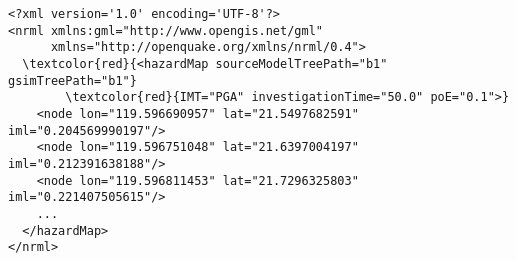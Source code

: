 \begin{Verbatim}[frame=single, commandchars=\\\{\}, fontsize=\small]
<?xml version='1.0' encoding='UTF-8'?>
<nrml xmlns:gml="http://www.opengis.net/gml"
      xmlns="http://openquake.org/xmlns/nrml/0.4">
  \textcolor{red}{<hazardMap sourceModelTreePath="b1" gsimTreePath="b1"}
        \textcolor{red}{IMT="PGA" investigationTime="50.0" poE="0.1">}
    <node lon="119.596690957" lat="21.5497682591" iml="0.204569990197"/>
    <node lon="119.596751048" lat="21.6397004197" iml="0.212391638188"/>
    <node lon="119.596811453" lat="21.7296325803" iml="0.221407505615"/>
    ...
  </hazardMap>
</nrml>
\end{Verbatim}
